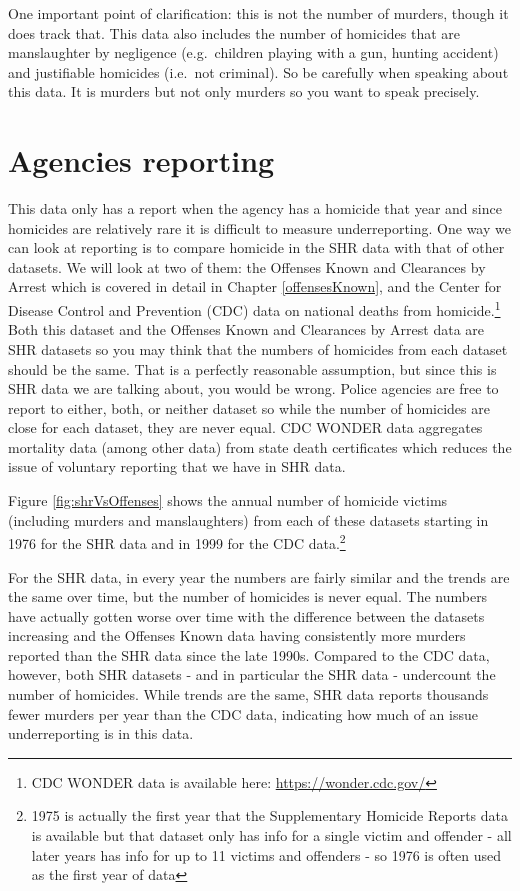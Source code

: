 \documentclass[
]{krantz}
\begin{document}
One important point of clarification: this is not the number
of murders, though it does track that. This data also
includes the number of homicides that are manslaughter by
negligence (e.g.~children playing with a gun, hunting
accident) and justifiable homicides (i.e.~not criminal). So
be carefully when speaking about this data. It is murders
but not only murders so you want to speak precisely.

\section{Agencies reporting}\label{agencies-reporting-2}

This data only has a report when the agency has a homicide
that year and since homicides are relatively rare it is
difficult to measure underreporting. One way we can look at
reporting is to compare homicide in the SHR data with that
of other datasets. We will look at two of them: the Offenses
Known and Clearances by Arrest which is covered in detail in
Chapter \ref{offensesKnown}, and the Center for Disease
Control and Prevention (CDC) data on national deaths from
homicide.\footnote{CDC WONDER data is available here:
  \url{https://wonder.cdc.gov/}} Both this dataset and the
Offenses Known and Clearances by Arrest data are SHR
datasets so you may think that the numbers of homicides from
each dataset should be the same. That is a perfectly
reasonable assumption, but since this is SHR data we are
talking about, you would be wrong. Police agencies are free
to report to either, both, or neither dataset so while the
number of homicides are close for each dataset, they are
never equal. CDC WONDER data aggregates mortality data
(among other data) from state death certificates which
reduces the issue of voluntary reporting that we have in SHR
data.

Figure \ref{fig:shrVsOffenses} shows the annual number of
homicide victims (including murders and manslaughters) from
each of these datasets starting in 1976 for the SHR data and
in 1999 for the CDC data.\footnote{1975 is actually the
  first year that the Supplementary Homicide Reports data is
  available but that dataset only has info for a single
  victim and offender - all later years has info for up to
  11 victims and offenders - so 1976 is often used as the
  first year of data}

For the SHR data, in every year the numbers are fairly
similar and the trends are the same over time, but the
number of homicides is never equal. The numbers have
actually gotten worse over time with the difference between
the datasets increasing and the Offenses Known data having
consistently more murders reported than the SHR data since
the late 1990s. Compared to the CDC data, however, both SHR
datasets - and in particular the SHR data - undercount the
number of homicides. While trends are the same, SHR data
reports thousands fewer murders per year than the CDC data,
indicating how much of an issue underreporting is in this
data.
\end{document}
